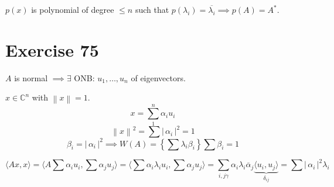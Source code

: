 \documentclass[a4paper]{article}
\theoremstyle{definition}
\newcommand\set[1]{\left\{#1\right\}}
\newcommand\card[1]{\left|\,#1\,\right|}
\newcommand\angel[1]{\langle#1\rangle}
\newcommand\norm[1]{\left\|{#1}\right\|}
\begin{document}
$p(x)$ is polynomial of degree $\leq n$ such that $p(\lambda_i) = \overline{\lambda_i} \implies p(A) = A^*$.

\section{Exercise 75}

$A$ is normal $\implies \exists$ ONB: $u_1, \dots, u_n$ of eigenvectors.

$x \in \mathbb C^n$ with $\norm{x} = 1$.
\[ x = \sum_1^n \alpha_i u_i \]
\[ \norm{x}^2 = \sum \card{\alpha_i}^2 = 1 \]
\[ \beta_i = \card{\alpha_i}^2 \implies W(A) = \set{\sum \lambda_i \beta_i}{\sum \beta_i = 1} \]

\[ \angel{Ax, x} = \angel{A \sum \alpha_i u_i, \sum \alpha_j u_j} = \angel{\sum \alpha_i \lambda_i u_i, \sum \alpha_j u_j} = \sum_{i,j\gamma} \alpha_i \lambda_i \overline\alpha_j \underbrace{\angel{u_i, u_j}}_{\delta_{ij}} = \sum \card{\alpha_i}^2 \lambda_i \]
\end{document}
